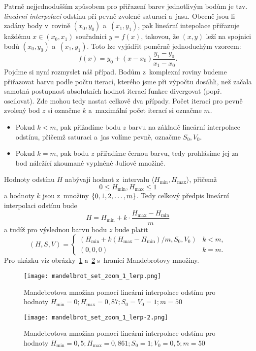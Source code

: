 Patrně nejjednodušším způsobem pro přiřazení barev jednotlivým bodům je tzv. \emph{lineární interpolací} odstínu při pevně zvolené saturaci a~jasu. Obecně jsou-li zadány body v~rovině $(x_0,y_0)$ a~$(x_1,y_1)$, pak lineární intepolace přiřazuje každému $x\in(x_0,x_1)$ souřadnici $y=f(x)$, takovou, že $(x,y)$ leží na spojnici bodů $(x_0,y_0)$ a~$(x_1,y_1)$. Toto lze vyjádřit poměrně jednoduchým vzorcem:
\[f(x)=y_{0}+(x-x_{0}){\frac {y_{1}-y_{0}}{x_{1}-x_{0}}}.\]
Pojďme si nyní rozmyslet náš případ. Bodům z~komplexní roviny budeme přiřazovat barvu podle počtu iterací, kterého jsme při výpočtu dosáhli, než začala samotná postupnost absolutních hodnot iterací funkce divergovat (popř. oscilovat). Zde mohou tedy nastat celkově dva případy. Počet iterací pro pevně zvolený bod $z$ si označme $k$ a~maximální počet iterací si označme $m$.
\begin{itemize}
    \item Pokud $k<m$, pak přižadíme bodu $z$ barvu na základě lineární interpolace odstínu, přičemž saturaci a~jas volíme pevně, označme $S_0,V_0$.
    \item Pokud $k=m$, pak bodu $z$ přiřadíme černou barvu, tedy prohlásíme jej za bod náležící zkoumané vyplněné Juliově množině.
\end{itemize}

Hodnoty odstínu $H$ nabývají hodnot z~intervalu $\langle H_{\text{min}},H_{\text{max}}\rangle$, přičemž
\[0\leqslant H_{\text{min}},H_{\text{max}}\leqslant 1\]
a hodnoty $k$ jsou z~množiny $\left\{0,1,2,\ldots,m\right\}$. Tedy celkový předpis lineární interpolaci odstínu bude
\[H=H_{\text{min}}+k\cdot\frac{H_{\text{max}}-H_{\text{min}}}{m}\]
a tudíž pro výslednou barvu bodu $z$ bude platit 
\[(H,S,V)=\begin{cases}
    \left(H_{\text{min}}+k(H_{\text{max}}-H_{\text{min}})/m,S_0,V_0\right) & k<m,\\
    (0,0,0) & k=m.
\end{cases}\]
Pro ukázku viz obrázky~\ref{fig:mandelbrotova-mnozina-lerp-1} a~\ref{fig:mandelbrotova-mnozina-lerp-2} s~hranicí Mandebrotovy množiny.
\begin{figure}[h]
    \centering
    \texttt{[image: mandelbrot\_set\_zoom\_1\_lerp.png]}
    \caption{Mandebrotova množina pomocí lineární interpolace odstínu pro hodnoty $H_{\text{min}}=0;H_{\text{max}}=0{,}87;S_0=V_0=1;m=50$}
    \label{fig:mandelbrotova-mnozina-lerp-1}
\end{figure}
\begin{figure}[h]
    \centering
    \texttt{[image: mandelbrot\_set\_zoom\_1\_lerp-2.png]}
    \caption{Mandebrotova množina pomocí lineární interpolace odstínu pro hodnoty $H_{\text{min}}=0{,}5;H_{\text{max}}=0{,}861;S_0=1;V_0=0{,}5;m=50$}
    \label{fig:mandelbrotova-mnozina-lerp-2}
\end{figure}

